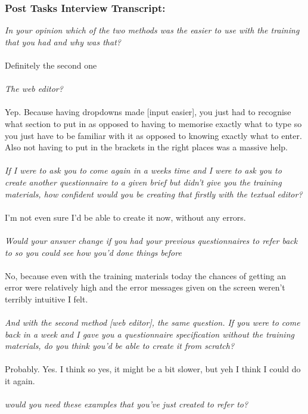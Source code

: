 \documentclass{report}
\begin{document}
\subsubsection*{Post Tasks Interview Transcript:}
\textit{In your opinion which of the two methods was the easier to use with the training that you had and why was that? } \\
\\
Definitely the second one
\\
\\
\textit{The web editor?}\\
\\
Yep.
Because having dropdowns made [input easier], you just had to recognise what section to put in as opposed to having to memorise exactly what to type so you just have to be familiar with it as opposed to knowing exactly what to enter. Also not having to put in the brackets in the right places was a massive help.
\\
\\
\textit{If I were to ask you to come again in a weeks time and I were to ask you to create another questionnaire to a given brief but didn't give you the training materials, how confident would you be creating that firstly with the textual editor?}
\\
\\
I'm not even sure I'd be able to create it now, without any errors.
\\
\\
\textit{Would your answer change if you had your previous questionnaires to refer back to so you could see how you'd done things before}\\
\\
No, because even with the training materials today the chances of getting an error were relatively high and the error messages given on the screen weren't terribly intuitive I felt.
\\
\\
\textit{And with the second method [web editor], the same question. If you were to come back in a week and I gave you a questionnaire specification without the training materials, do you think you'd be able to create it from scratch?}
\\
\\
Probably. Yes. I think so yes, it might be a bit slower, but yeh I think I could do it again.
\\
\\
\textit{would you need these examples that you've just created to refer to?}
\end{document}
